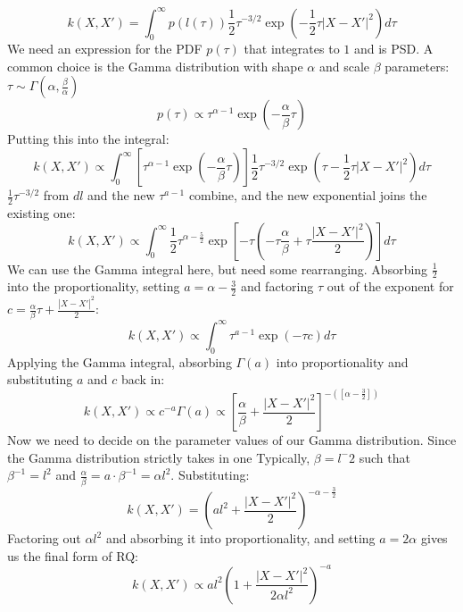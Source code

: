 \begin{equation*}
    k(X,X') = \int_{0}^{\infty} p(l(\tau)) \frac{1}{2} \tau^{-3/2} \exp \left( -\frac{1}{2} \tau |X - X'|^2 \right) d\tau
\end{equation*}
We need an expression for the PDF $p(\tau)$ that integrates to $1$ and is PSD. A common choice is the Gamma distribution with shape $\alpha$ and scale $\beta$ parameters: $\tau \sim \Gamma(\alpha, \frac{\beta}{\alpha})$ 
\begin{equation*}
    p(\tau) \propto \tau ^{\alpha - 1} \exp \left( - \frac{\alpha}{\beta} \tau \right)
\end{equation*}
Putting this into the integral:
\begin{equation*}
    k(X,X') \propto \int_{0}^{\infty}  \left[ \tau^{\alpha - 1} \exp \left(-\frac{\alpha}{\beta} \tau \right) \right] \frac{1}{2}\tau^{-3/2} \exp \left( \tau - \frac{1}{2} \tau |X - X'|^2 \right) d\tau
\end{equation*}
$\frac{1}{2}\tau^{-3/2}$ from $dl$ and the new $\tau^{a-1}$ combine, and the new exponential joins the existing one:
\begin{equation*}
    k(X,X') \propto \int_{0}^{\infty} \frac{1}{2} \tau^{\alpha - \frac{5}{2}} \exp \left[ -\tau \left( -\tau\frac{\alpha}{\beta} + \tau \frac{|X - X'|^2}{2} \right) \right] d\tau
\end{equation*}
We can use the Gamma integral here, but need some rearranging. Absorbing $\frac{1}{2}$ into the proportionality, setting $a = \alpha - \frac{3}{2}$ and factoring $\tau$ out of the exponent for $c = \frac{\alpha}{\beta}\tau + \frac{|X - X'|^2}{2}$:
\begin{equation*}
    k(X,X') \propto \int_{0}^{\infty} \tau^{a - 1} \exp ( -\tau c ) d\tau
\end{equation*}
Applying the Gamma integral, absorbing $\Gamma(a)$ into proportionality and substituting $a$ and $c$ back in:
\begin{equation*}
    k(X,X') \propto c^{-a} \Gamma(a) \propto \left[ \frac{\alpha}{\beta} + \frac{|X - X'|^2}{2} \right]^{-\left( \left[ \alpha - \frac{3}{2} \right] \right)} 
\end{equation*}
Now we need to decide on the parameter values of our Gamma distribution. Since the Gamma distribution strictly takes in one Typically, $\beta = l^-2$ such that $\beta^{-1} = l^2$ and $\frac{\alpha}{\beta} = a \cdot \beta^{-1} = \alpha l^2$. Substituting:
\begin{equation*}
    k(X,X') = \left( al^2 + \frac{|X - X'|^2}{2} \right)^{-\alpha - \frac{3}{2}}
\end{equation*}
Factoring out $\alpha l^2$ and absorbing it into proportionality, and setting $a = 2\alpha$ gives us the final form of RQ:
\begin{equation*}
    k(X,X') \propto al^2 \left( 1 + \frac{|X - X'|^2}{2\alpha l^2} \right)^{-a}
\end{equation*}


